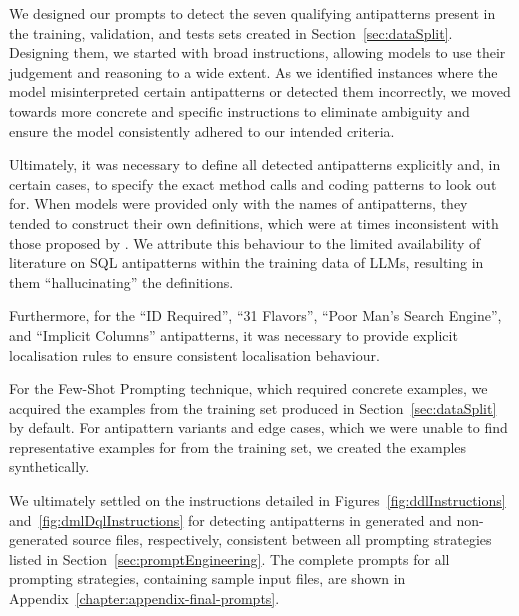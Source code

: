 We designed our prompts to detect the seven qualifying antipatterns present in the training, validation, and tests sets created in Section~\ref{sec:dataSplit}. Designing them, we started with broad instructions, allowing models to use their judgement and reasoning to a wide extent. As we identified instances where the model misinterpreted certain antipatterns or detected them incorrectly, we moved towards more concrete and specific instructions to eliminate ambiguity and ensure the model consistently adhered to our intended criteria.

Ultimately, it was necessary to define all detected antipatterns explicitly and, in certain cases, to specify the exact method calls and coding patterns to look out for. When models were provided only with the names of antipatterns, they tended to construct their own definitions, which were at times inconsistent with those proposed by . We attribute this behaviour to the limited availability of literature on SQL antipatterns within the training data of LLMs, resulting in them “hallucinating” the definitions.

Furthermore, for the “ID Required”, “31 Flavors”, “Poor Man's Search Engine”, and “Implicit Columns” antipatterns, it was necessary to provide explicit localisation rules to ensure consistent localisation behaviour.

For the Few-Shot Prompting technique, which required concrete examples, we acquired the examples from the training set produced in Section~\ref{sec:dataSplit} by default. For antipattern variants and edge cases, which we were unable to find representative examples for from the training set, we created the examples synthetically.

We ultimately settled on the instructions detailed in Figures~\ref{fig:ddlInstructions} and~\ref{fig:dmlDqlInstructions} for detecting antipatterns in generated and non-generated source files, respectively, consistent between all prompting strategies listed in Section~\ref{sec:promptEngineering}. The complete prompts for all prompting strategies, containing sample input files, are shown in Appendix~\ref{chapter:appendix-final-prompts}.

